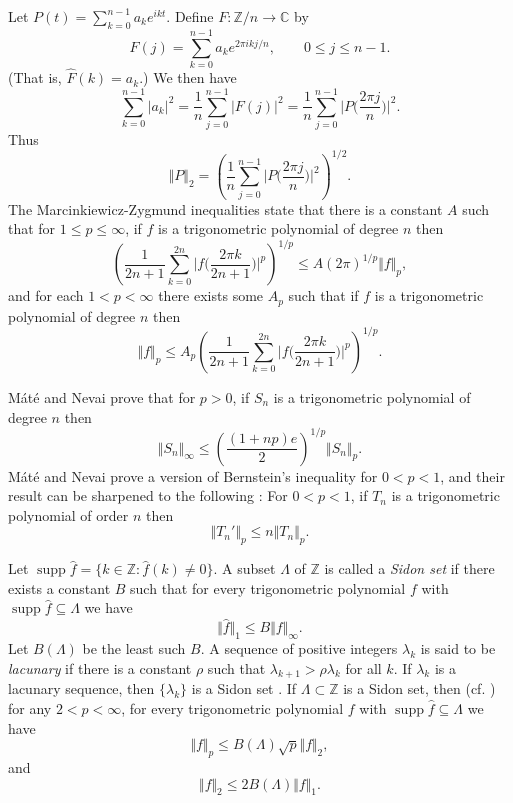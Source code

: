 \documentclass{article}
\newcommand{\norm}[1]{\Vert #1 \Vert}
\newcommand{\supp}{\mathop{\mathrm{supp}}}
\theoremstyle{definition}
\begin{document}
Let $P(t)=\sum_{k=0}^{n-1} a_k e^{ikt}$. Define $F:\mathbb{Z}/n \to \mathbb{C}$ by
\[
F(j)=\sum_{k=0}^{n-1} a_k e^{2\pi ikj/n}, \qquad 0 \leq j \leq n-1.
\]
(That is, $\hat{F}(k)=a_k$.)
We then have 
\[
\sum_{k=0}^{n-1} |a_k|^2=\frac{1}{n}\sum_{j=0}^{n-1} |F(j)|^2 = \frac{1}{n} \sum_{j=0}^{n-1} \big|P\Big(\frac{2\pi j}{n}\Big)\big|^2.
\]
Thus
\[
\norm{P}_2=\left( \frac{1}{n}  \sum_{j=0}^{n-1} \big|P\Big(\frac{2\pi j}{n}\Big)\big|^2 \right)^{1/2}.
\]
The Marcinkiewicz-Zygmund inequalities \cite[vol.~II, p.~28, chap.~X, Theorem~7.5]{zygmund} state that there is a constant $A$ such that 
for $1 \leq p \leq \infty$, if $f$ is a trigonometric polynomial of degree $n$ then
\[
\left( \frac{1}{2n+1} \sum_{k=0}^{2n} \big|f\Big(\frac{2\pi k}{2n+1}\Big)\big|^p \right)^{1/p} \leq A(2\pi)^{1/p} \norm{f}_p,
\]
and for each $1 < p < \infty$ there exists some $A_p$ such that if $f$ is a trigonometric polynomial of degree $n$ then
\[
\norm{f}_p \leq A_p \left( \frac{1}{2n+1} \sum_{k=0}^{2n} \big|f\Big(\frac{2\pi k}{2n+1}\Big)\big|^p \right)^{1/p}.
\]

M{\'a}t{\'e} and Nevai \cite[p.~148, Theorem~6]{MR558399} prove that for $p>0$, if $S_n$ is a trigonometric polynomial of degree $n$ then
\[
\norm{S_n}_\infty \leq \left( \frac{(1+np)e}{2} \right)^{1/p} \norm{S_n}_p.
\]
M{\'a}t{\'e} and Nevai \cite{MR558399} prove a version of Bernstein's inequality for $0<p<1$, and their result
can be sharpened to the following \cite{MR1016168}: For $0<p<1$, if $T_n$ is a trigonometric polynomial
of order $n$ then
\[
\norm{T_n'}_p \leq n \norm{T_n}_p.
\]

Let $\supp \hat{f}=\{k \in \mathbb{Z}: \hat{f}(k) \neq 0\}$. A subset $\Lambda$ of $\mathbb{Z}$ is called a {\em Sidon set}  \cite[p.~121, \S 5.7.2]{groups} if there exists a constant $B$
such that for every trigonometric polynomial $f$ with $\supp \hat{f} \subseteq \Lambda$ we have
\[
\norm{\hat{f}}_1 \leq B \norm{f}_\infty.
\]
Let $B(\Lambda)$ be the least such $B$.
A sequence of positive integers $\lambda_k$ is said to be {\em lacunary} if there is a constant $\rho$ such that $\lambda_{k+1} > \rho \lambda_k$ for all
$k$. If $\lambda_k$ is a lacunary sequence, then $\{\lambda_k\}$ is a Sidon set \cite[p.~154, Corollary~6.17]{schlag}. 
If $\Lambda \subset \mathbb{Z}$ is a Sidon set, then \cite[p.~128, Theorem~5.7.7]{groups} (cf. \cite[p.~157, Corollary~6.19]{schlag}) for any $2 < p < \infty$,
for every trigonometric polynomial $f$ with $\supp \hat{f} \subseteq \Lambda$ we have 
\[
\norm{f}_p \leq B(\Lambda) \sqrt{p} \norm{f}_2,
\]
and
\[
\norm{f}_2 \leq 2B(\Lambda) \norm{f}_1.
\]
\end{document}
